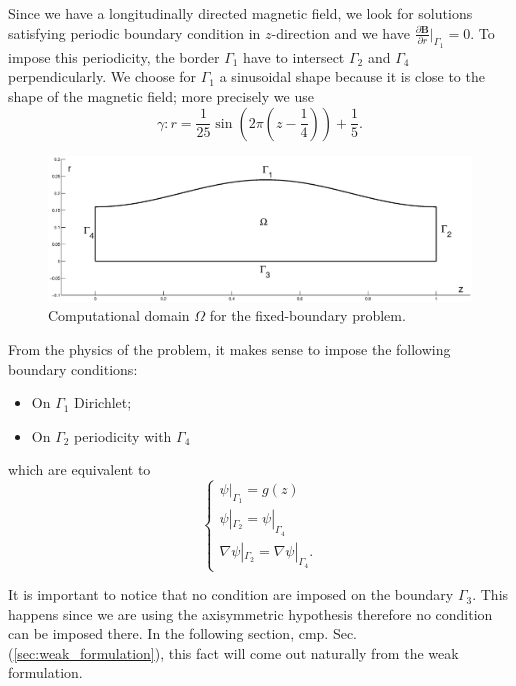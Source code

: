 Since we have a longitudinally directed magnetic field, we look for solutions satisfying periodic boundary condition in $z$-direction \cite[\S 6.2]{magnetic_mirror} and we have $\frac{\partial\mathbf{B}}{\partial r}|_{\Gamma_1}=0$. To impose this periodicity, the border $\Gamma_1$ have to intersect $\Gamma_2$ and $\Gamma_4$ perpendicularly. We choose for $\Gamma_1$ a sinusoidal shape because it is close to the shape of the magnetic field; more precisely we use
\begin{equation}\label{eq:border_equation}
  \gamma:r=\frac{1}{25}\sin(2\pi(z-\frac{1}{4}))+\frac{1}{5}.
\end{equation}

\begin{figure}
\centering
\includegraphics[scale=0.4]{images/mirror_matlab.eps}
\caption{Computational domain $\Omega$ for the fixed-boundary problem.}\label{fig:mirror_domain}
\end{figure}

From the physics of the problem, it makes sense to impose the following boundary conditions:
\begin{itemize}
  \item On $\Gamma_1$ Dirichlet;
  \item On $\Gamma_2$ periodicity with $\Gamma_4$
\end{itemize}
which are equivalent to
\begin{equation}\label{eq:bc}
  \begin{cases}
    \psi|_{\Gamma_1}=g(z)\\
    \psi|_{\Gamma_2}=\psi|_{\Gamma_4}\\
    \nabla\psi|_{\Gamma_2}=\nabla\psi|_{\Gamma_4}.
  \end{cases}
\end{equation}

It is important to notice that no condition are imposed on the boundary $\Gamma_3$. This happens since we are using the axisymmetric hypothesis therefore no condition can be imposed there. In the following section, cmp. Sec.(\ref{sec:weak_formulation}), this fact will come out naturally from the weak formulation.

